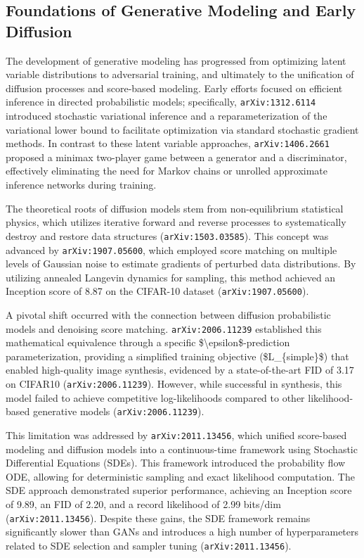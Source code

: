 \documentclass[11pt]{article}
\begin{document}
\subsection{Foundations of Generative Modeling and Early Diffusion}

The development of generative modeling has progressed from optimizing latent variable distributions to adversarial training, and ultimately to the unification of diffusion processes and score-based modeling. Early efforts focused on efficient inference in directed probabilistic models; specifically, \texttt{arXiv:1312.6114} introduced stochastic variational inference and a reparameterization of the variational lower bound to facilitate optimization via standard stochastic gradient methods. In contrast to these latent variable approaches, \texttt{arXiv:1406.2661} proposed a minimax two-player game between a generator and a discriminator, effectively eliminating the need for Markov chains or unrolled approximate inference networks during training.

The theoretical roots of diffusion models stem from non-equilibrium statistical physics, which utilizes iterative forward and reverse processes to systematically destroy and restore data structures (\texttt{arXiv:1503.03585}). This concept was advanced by \texttt{arXiv:1907.05600}, which employed score matching on multiple levels of Gaussian noise to estimate gradients of perturbed data distributions. By utilizing annealed Langevin dynamics for sampling, this method achieved an Inception score of 8.87 on the CIFAR-10 dataset (\texttt{arXiv:1907.05600}).

A pivotal shift occurred with the connection between diffusion probabilistic models and denoising score matching. \texttt{arXiv:2006.11239} established this mathematical equivalence through a specific \$\textbackslash{}epsilon\$-prediction parameterization, providing a simplified training objective (\$L\_\{simple\}\$) that enabled high-quality image synthesis, evidenced by a state-of-the-art FID of 3.17 on CIFAR10 (\texttt{arXiv:2006.11239}). However, while successful in synthesis, this model failed to achieve competitive log-likelihoods compared to other likelihood-based generative models (\texttt{arXiv:2006.11239}).

This limitation was addressed by \texttt{arXiv:2011.13456}, which unified score-based modeling and diffusion models into a continuous-time framework using Stochastic Differential Equations (SDEs). This framework introduced the probability flow ODE, allowing for deterministic sampling and exact likelihood computation. The SDE approach demonstrated superior performance, achieving an Inception score of 9.89, an FID of 2.20, and a record likelihood of 2.99 bits/dim (\texttt{arXiv:2011.13456}). Despite these gains, the SDE framework remains significantly slower than GANs and introduces a high number of hyperparameters related to SDE selection and sampler tuning (\texttt{arXiv:2011.13456}).
\end{document}
